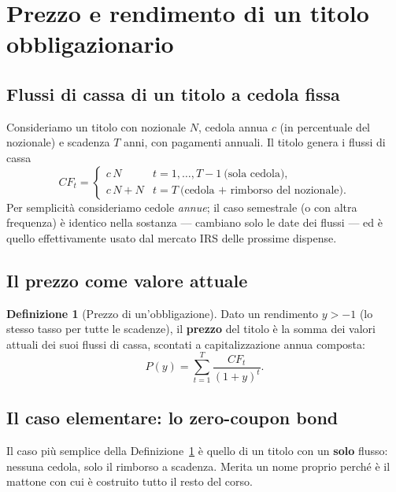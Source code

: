 \documentclass[11pt,a4paper]{article}
\theoremstyle{plain}
\theoremstyle{definition}
\newtheorem{definizione}[teorema]{Definizione}
\theoremstyle{remark}
\begin{document}
\section{Prezzo e rendimento di un titolo obbligazionario}

\subsection{Flussi di cassa di un titolo a cedola fissa}

Consideriamo un titolo con nozionale $N$, cedola annua $c$ (in percentuale del nozionale) e
scadenza $T$ anni, con pagamenti annuali. Il titolo genera i flussi di cassa
\[
  CF_t = \begin{cases} c\,N & t = 1,\ldots,T-1 \ \text{(sola cedola)},\\
                       c\,N + N & t = T \ \text{(cedola + rimborso del nozionale)}. \end{cases}
\]
Per semplicità consideriamo cedole \emph{annue}; il caso semestrale (o con altra frequenza) è
identico nella sostanza --- cambiano solo le date dei flussi --- ed è quello effettivamente
usato dal mercato IRS delle prossime dispense.

\subsection{Il prezzo come valore attuale}

\begin{definizione}[Prezzo di un'obbligazione]
\label{def:prezzo-bond}
Dato un rendimento $y > -1$ (lo stesso tasso per tutte le scadenze), il \textbf{prezzo} del
titolo è la somma dei valori attuali dei suoi flussi di cassa, scontati a capitalizzazione
annua composta:
\begin{equation}
  P(y) = \sum_{t=1}^{T} \frac{CF_t}{(1+y)^t}.
  \label{eq:prezzo}
\end{equation}
\end{definizione}

\subsection{Il caso elementare: lo zero-coupon bond}
\label{sec:zcb}

Il caso più semplice della Definizione~\ref{def:prezzo-bond} è quello di un titolo con un
\textbf{solo} flusso: nessuna cedola, solo il rimborso a scadenza. Merita un nome proprio
perché è il mattone con cui è costruito tutto il resto del corso.
\end{document}

